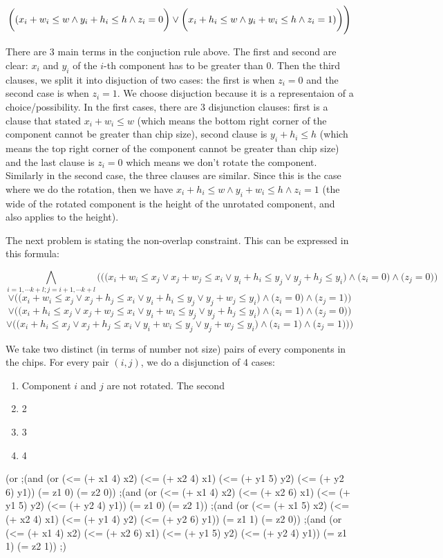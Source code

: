 \documentclass[12pt]{article}
\begin{document}
\[{\bigg((x_i+w_i \leq w \wedge y_i+h_i \leq h \wedge z_i=0\bigg) \vee \\ \bigg(x_i+h_i \leq w \wedge y_i+w_i \leq h \wedge z_i=1)\bigg)\Bigg)} \]


There are 3 main terms in the conjuction rule above. The first and second are clear: $x_i$ and $y_i$ of the $i$-th component has to be greater than 0. Then the third clauses, we split it into disjuction of two cases: the first is when $z_i=0$ and the second case is when $z_i=1$. We choose disjuction because it is a representaion of a choice/possibility. In the first cases, there are 3 disjunction clauses: first is a clause that stated $x_i+w_i \leq w$ (which means the bottom right corner of the component cannot be greater than chip size), second clause is $y_i+h_i \leq h$ (which means the top right corner of the component cannot be greater than chip size) and the last clause is $z_i=0$ which means we don't rotate the component. Similarly in the second case, the three clauses are similar. Since this is the case where we do the rotation, then we have $x_i+h_i \leq w \wedge y_i+w_i \leq h \wedge z_i=1$ (the wide of the rotated component is the height of the unrotated component, and also applies to the height).

The next problem is stating the non-overlap constraint. This can be expressed in this formula:

\[ \bigwedge_{i=1,\cdots k+l; j=i+1,\cdots k+l}{\Bigg(\bigg(\Big(x_i+w_i \leq x_j \vee x_j+w_j \leq x_i \vee y_i+h_i \leq y_j \vee y_j+h_j \leq y_i \Big)  \wedge \Big(z_i=0\Big) \wedge \Big(z_j=0\Big)\bigg) }\]
\[{\vee \bigg(\Big(x_i+w_i \leq x_j \vee x_j+h_j \leq x_i \vee y_i+h_i \leq y_j \vee y_j+w_j \leq y_i \Big)  \wedge \Big(z_i=0\Big) \wedge \Big(z_j=1\Big)\bigg) }\]
\[{\vee \bigg(\Big(x_i+h_i \leq x_j \vee x_j+w_j \leq x_i \vee y_i+w_i \leq y_j \vee y_j+h_j \leq y_i \Big)  \wedge \Big(z_i=1\Big) \wedge \Big(z_j=0\Big)\bigg)}\]
\[{ \vee \bigg(\Big(x_i+h_i \leq x_j \vee x_j+h_j \leq x_i \vee y_i+w_i \leq y_j \vee y_j+w_j \leq y_i \Big)  \wedge \Big(z_i=1\Big) \wedge \Big(z_j=1\Big)\bigg) \Bigg)}\]

We take two distinct (in terms of number not size) pairs of every components in the chips. For every pair $(i,j)$, we do a disjunction of 4 cases: 
\begin{enumerate}
	\item Component $i$ and $j$ are not rotated. The second
	\item 2
	\item 3
	\item 4
\end{enumerate}
(or
;(and (or (<= (+ x1 4) x2) (<= (+ x2 4) x1) (<= (+ y1 5) y2) (<= (+ y2 6) y1)) (= z1 0) (= z2 0))
;(and (or (<= (+ x1 4) x2) (<= (+ x2 6) x1) (<= (+ y1 5) y2) (<= (+ y2 4) y1)) (= z1 0) (= z2 1))
;(and (or (<= (+ x1 5) x2) (<= (+ x2 4) x1) (<= (+ y1 4) y2) (<= (+ y2 6) y1)) (= z1 1) (= z2 0))
;(and (or (<= (+ x1 4) x2) (<= (+ x2 6) x1) (<= (+ y1 5) y2) (<= (+ y2 4) y1)) (= z1 1) (= z2 1))
;)
\end{document}
